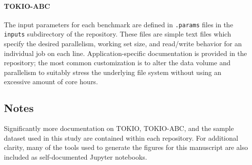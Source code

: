 \paragraph{TOKIO-ABC} The input parameters for each benchmark are defined in \texttt{.params} files in the \texttt{inputs} subdirectory of the repository.
These files are simple text files which specify the desired parallelism, working set size, and read/write behavior for an individual job on each line.
Application-specific documentation is provided in the repository; the most common customization is to alter the data volume and parallelism to suitably stress the underlying file system without using an excessive amount of core hours.

\subsection{Notes}

Significantly more documentation on TOKIO, TOKIO-ABC, and the sample dataset used in this study are contained within each repository.
For additional clarity, many of the tools used to generate the figures for this manuscript are also included as self-documented Jupyter notebooks.